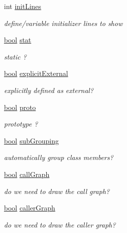 \begin{DoxyCompactItemize}
int \hyperlink{class_entry_ae283a992b9a74c6925c6f602ba7d830d}{init\+Lines}
\begin{DoxyCompactList}\small\item\em define/variable initializer lines to show \end{DoxyCompactList}\item 
\hyperlink{qglobal_8h_a1062901a7428fdd9c7f180f5e01ea056}{bool} \hyperlink{class_entry_ab5f1d92a0b5d8abdf4d42cefc134fdfa}{stat}
\begin{DoxyCompactList}\small\item\em static ? \end{DoxyCompactList}\item 
\hyperlink{qglobal_8h_a1062901a7428fdd9c7f180f5e01ea056}{bool} \hyperlink{class_entry_a6c5a4c9eda694f2bfd2037d7da08ba5d}{explicit\+External}
\begin{DoxyCompactList}\small\item\em explicitly defined as external? \end{DoxyCompactList}\item 
\hyperlink{qglobal_8h_a1062901a7428fdd9c7f180f5e01ea056}{bool} \hyperlink{class_entry_a14c9abc36afe46d02521ef846e6bcc27}{proto}
\begin{DoxyCompactList}\small\item\em prototype ? \end{DoxyCompactList}\item 
\hyperlink{qglobal_8h_a1062901a7428fdd9c7f180f5e01ea056}{bool} \hyperlink{class_entry_a095b43379529186300dd6a8d8830d5dc}{sub\+Grouping}
\begin{DoxyCompactList}\small\item\em automatically group class members? \end{DoxyCompactList}\item 
\hyperlink{qglobal_8h_a1062901a7428fdd9c7f180f5e01ea056}{bool} \hyperlink{class_entry_ac3b5637ee0f8469650e2d8d694733314}{call\+Graph}
\begin{DoxyCompactList}\small\item\em do we need to draw the call graph? \end{DoxyCompactList}\item 
\hyperlink{qglobal_8h_a1062901a7428fdd9c7f180f5e01ea056}{bool} \hyperlink{class_entry_a3693baa860ccc1625b5ac4fd3bc1761c}{caller\+Graph}
\begin{DoxyCompactList}\small\item\em do we need to draw the caller graph? \end{DoxyCompactList}\item 

\end{DoxyCompactItemize}
